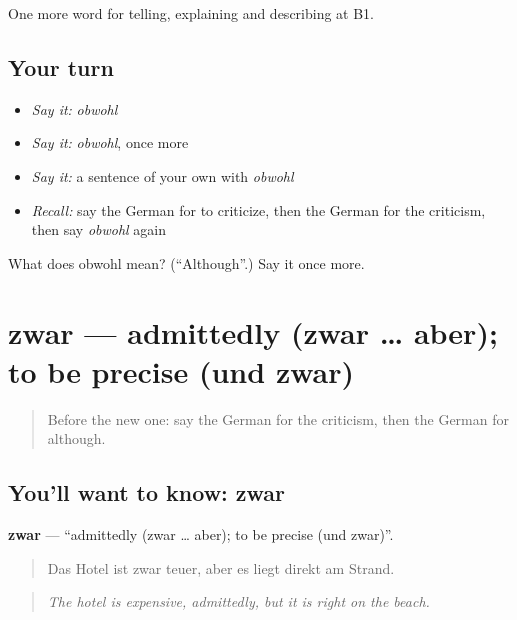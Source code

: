 \begin{grammarlens}[title={What you've built}]
One more word for telling, explaining and describing at B1.
\end{grammarlens}

\subsection*{Your turn}
\begin{itemize}
\raggedright
  \item \emph{Say it:} \emph{obwohl}
  \item \emph{Say it:} \emph{obwohl}, once more
  \item \emph{Say it:} a sentence of your own with \emph{obwohl}
  \item \emph{Recall:} say the German for to criticize, then the German for the criticism, then say \emph{obwohl} again
\end{itemize}

\begin{tcolorbox}[breakable,colback=teal!4,colframe=teal!35!black,title={Before you move on}]
What does obwohl mean? (\textquotedblleft{}Although\textquotedblright{}.) Say it once more.
\end{tcolorbox}
\section[zwar]{zwar — admittedly (zwar … aber); to be precise (und zwar)}

\label{lesson:GE-C341-zwar}



\begin{quote}
Before the new one: say the German for the criticism, then the German for although.
\end{quote}

\subsection*{You'll want to know: zwar}
\textbf{zwar} — \textquotedblleft{}admittedly (zwar … aber); to be precise (und zwar)\textquotedblright{}.

\begin{quote}
Das Hotel ist zwar teuer, aber es liegt direkt am Strand.
\end{quote}

\begin{quote}
\emph{The hotel is expensive, admittedly, but it is right on the beach.}
\end{quote}

